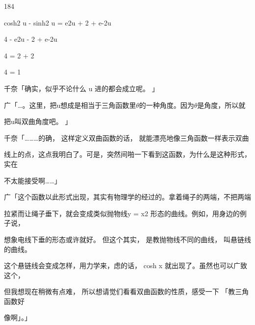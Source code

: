 184\par
cosh2 u - sinh2 u = e2u + 2 + e-2u\par
4 - e2u - 2 + e-2u\par
4 = 2 + 2\par
4 = 1\par
千奈「确实，似乎不论什么 u 进的都会成立呢。 」\par
广「…。这里，把u想成是相当于三角函数里$\theta$的一种角度。因为$\theta$是角度，所以就\par
把u叫双曲角度吧。 」\par
千奈「………的确， 这样定义双曲函数的话， 就能漂亮地像三角函数一样表示双曲\par
线上的点，这点我明白了。可是，突然间啪一下看到这函数，为什么是这种形式，实在\par
不太能接受啊……」\par
广「这个函数以此形式出现，其实有物理学的经过的。拿着绳子的两端，不把两端\par
拉紧而让绳子垂下，就会变成类似抛物线y = x2 形态的曲线。例如，用身边的例子说，\par
想象电线下垂的形态或许就好。 但这个其实， 是教抛物线不同的曲线， 叫悬链线的曲线。\par
这个悬链线会变成怎样，用力学来，虑的话， cosh x 就出现了。虽然也可以广致这个，\par
但我想现在稍微有点难， 所以想请觉们看看双曲函数的性质，感受一下 「教三角函数好\par
像啊」。」\par

